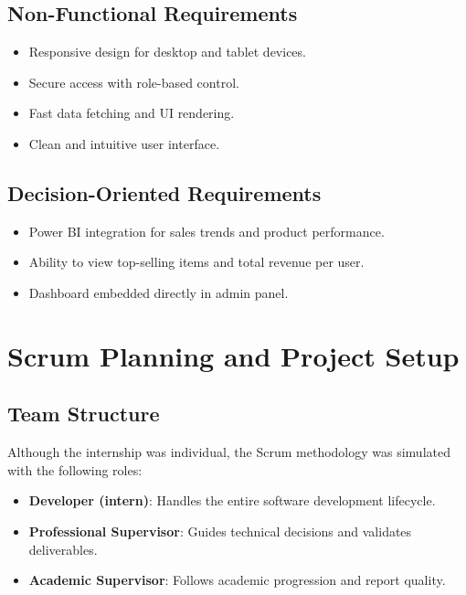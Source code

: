 \subsection{Non-Functional Requirements}

\begin{itemize}
  \item Responsive design for desktop and tablet devices.
  \item Secure access with role-based control.
  \item Fast data fetching and UI rendering.
  \item Clean and intuitive user interface.
\end{itemize}

\subsection{Decision-Oriented Requirements}

\begin{itemize}
  \item Power BI integration for sales trends and product performance.
  \item Ability to view top-selling items and total revenue per user.
  \item Dashboard embedded directly in admin panel.
\end{itemize}

\section{Scrum Planning and Project Setup}

\subsection{Team Structure}

Although the internship was individual, the Scrum methodology was simulated with the following roles:

\begin{itemize}
  \item \textbf{Developer (intern)}: Handles the entire software development lifecycle.
  \item \textbf{Professional Supervisor}: Guides technical decisions and validates deliverables.
  \item \textbf{Academic Supervisor}: Follows academic progression and report quality.
\end{itemize}

